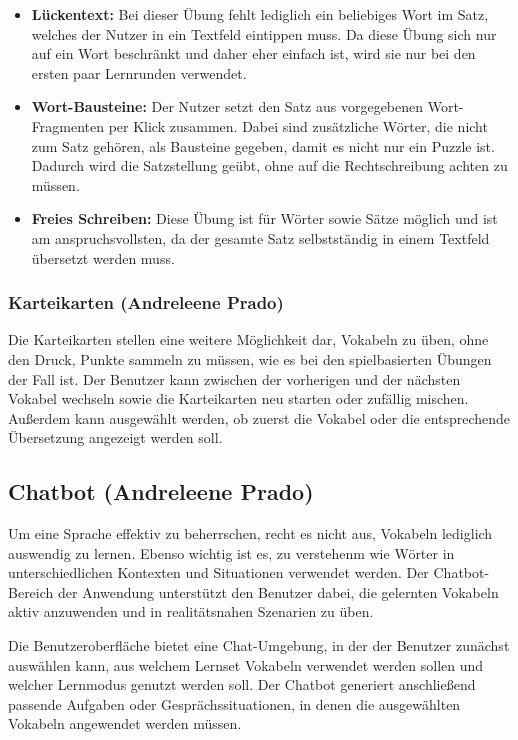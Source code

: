 \begin{itemize}
\item \textbf{Lückentext:} Bei dieser Übung fehlt lediglich ein beliebiges Wort im Satz, welches der Nutzer in ein Textfeld eintippen muss. Da diese Übung sich nur auf ein Wort beschränkt und daher eher einfach ist, wird sie nur bei den ersten paar Lernrunden verwendet.
\item \textbf{Wort-Bausteine:} Der Nutzer setzt den Satz aus vorgegebenen Wort-Fragmenten per Klick zusammen. Dabei sind zusätzliche Wörter, die nicht zum Satz gehören, als Bausteine gegeben, damit es nicht nur ein Puzzle ist. Dadurch wird die Satzstellung geübt, ohne auf die Rechtschreibung achten zu müssen.
\item \textbf{Freies Schreiben:} Diese Übung ist für Wörter sowie Sätze möglich und ist am anspruchsvollsten, da der gesamte Satz selbstständig in einem Textfeld übersetzt werden muss.
\end{itemize}

\subsubsection{Karteikarten (Andreleene Prado)}
Die Karteikarten stellen eine weitere Möglichkeit dar, Vokabeln zu üben, ohne den Druck, Punkte sammeln zu müssen, wie es bei den spielbasierten Übungen der Fall ist.
Der Benutzer kann zwischen der vorherigen und der nächsten Vokabel wechseln sowie die Karteikarten neu starten oder zufällig mischen.
Außerdem kann ausgewählt werden, ob zuerst die Vokabel oder die entsprechende Übersetzung angezeigt werden soll.

\subsection{Chatbot (Andreleene Prado)}
Um eine Sprache effektiv zu beherrschen, recht es nicht aus, Vokabeln lediglich auswendig zu lernen.
Ebenso wichtig ist es, zu verstehenm wie Wörter in unterschiedlichen Kontexten und Situationen verwendet werden.
Der Chatbot-Bereich der Anwendung unterstützt den Benutzer dabei, die gelernten Vokabeln aktiv anzuwenden und in realitätsnahen Szenarien zu üben.

Die Benutzeroberfläche bietet eine Chat-Umgebung, in der der Benutzer zunächst auswählen kann, aus welchem Lernset Vokabeln verwendet werden sollen und welcher Lernmodus genutzt werden soll.
Der Chatbot generiert anschließend passende Aufgaben oder Gesprächssituationen, in denen die ausgewählten Vokabeln angewendet werden müssen.

